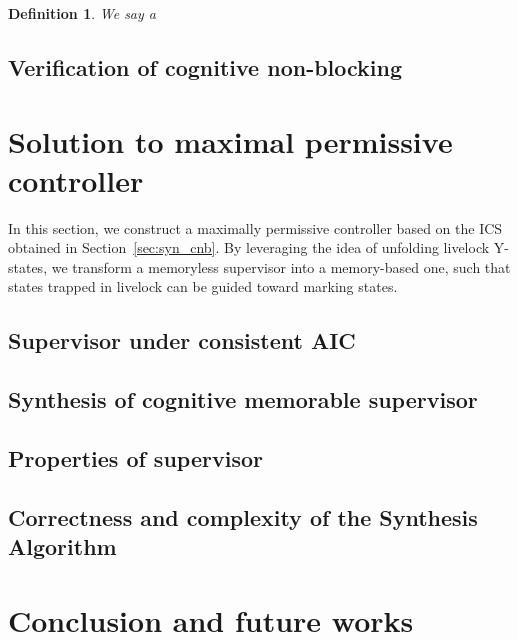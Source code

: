 \documentclass{article}
\newtheorem{definition}{Definition}
\begin{document}
\begin{definition}
    We say a 
\end{definition}

\subsection{Verification of cognitive non-blocking}

%
%
\section{Solution to maximal permissive controller}\label{sec:mpc}

In this section, we construct a maximally permissive controller based on the ICS obtained in Section~\ref{sec:syn_cnb}. 
By leveraging the idea of unfolding livelock Y-states, we transform a memoryless supervisor into a memory-based one, 
such that states trapped in livelock can be guided toward marking states.

\subsection{Supervisor under consistent AIC}


\subsection{Synthesis of cognitive memorable supervisor}

\subsection{Properties of supervisor}

\subsection{Correctness and complexity of the Synthesis Algorithm}


%
\section{Conclusion and future works}
\end{document}

